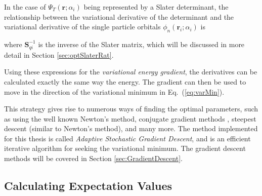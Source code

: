 
In the case of $\Psi_T(\mathbf{r}; \alpha_i)$ being represented by a Slater determinant, the relationship between the variational derivative of the determinant and the variational derivative of the single particle orbitals $\phi_n(\mathbf{r}_i; \alpha_i)$ is


where $\mathbf{S}^{-1}_{qi}$ is the inverse of the Slater matrix, which will be discussed in more detail in Section \ref{sec:optSlaterRat}. 

Using these expressions for the \textit{variational energy gradient}, the derivatives can be calculated exactly the same way the energy. The gradient can then be used to move in the direction of the variational minimum in Eq.~(\ref{eq:varMin}). 

This strategy gives rise to numerous ways of finding the optimal parameters, such as using the well known Newton's method, conjugate gradient methods \cite{golub1996matrix}, steepest descent (similar to Newton's method), and many more. 
The method implemented for this thesis is called \textit{Adaptive Stochastic Gradient Descent}, and is an efficient iterative algorithm for seeking the variational minimum. The gradient descent methods will be covered in Section \ref{sec:GradientDescent}.

\subsection{Calculating Expectation Values}
\label{sec:calcExpVals}

